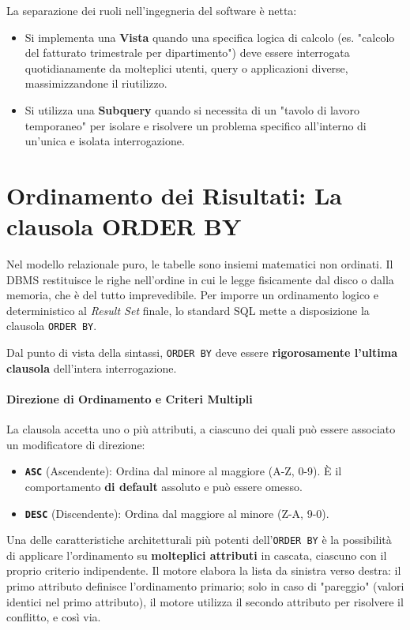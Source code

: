 \begin{bestpractice}
La separazione dei ruoli nell'ingegneria del software è netta:
\begin{itemize}
    \item Si implementa una \textbf{Vista} quando una specifica logica di calcolo (es. "calcolo del fatturato trimestrale per dipartimento") deve essere interrogata quotidianamente da molteplici utenti, query o applicazioni diverse, massimizzandone il riutilizzo.
    \item Si utilizza una \textbf{Subquery} quando si necessita di un "tavolo di lavoro temporaneo" per isolare e risolvere un problema specifico all'interno di un'unica e isolata interrogazione.
\end{itemize}
\end{bestpractice}

\section{Ordinamento dei Risultati: La clausola ORDER BY}

Nel modello relazionale puro, le tabelle sono insiemi matematici non ordinati. Il DBMS restituisce le righe nell'ordine in cui le legge fisicamente dal disco o dalla memoria, che è del tutto imprevedibile. Per imporre un ordinamento logico e deterministico al \textit{Result Set} finale, lo standard SQL mette a disposizione la clausola \texttt{ORDER BY}.

Dal punto di vista della sintassi, \texttt{ORDER BY} deve essere \textbf{rigorosamente l'ultima clausola} dell'intera interrogazione.

\paragraph{Direzione di Ordinamento e Criteri Multipli}
La clausola accetta uno o più attributi, a ciascuno dei quali può essere associato un modificatore di direzione:
\begin{itemize}
    \item \textbf{\texttt{ASC}} (Ascendente): Ordina dal minore al maggiore (A-Z, 0-9). È il comportamento \textbf{di default} assoluto e può essere omesso.
    \item \textbf{\texttt{DESC}} (Discendente): Ordina dal maggiore al minore (Z-A, 9-0).
\end{itemize}

Una delle caratteristiche architetturali più potenti dell'\texttt{ORDER BY} è la possibilità di applicare l'ordinamento su \textbf{molteplici attributi} in cascata, ciascuno con il proprio criterio indipendente. Il motore elabora la lista da sinistra verso destra: il primo attributo definisce l'ordinamento primario; solo in caso di "pareggio" (valori identici nel primo attributo), il motore utilizza il secondo attributo per risolvere il conflitto, e così via.

